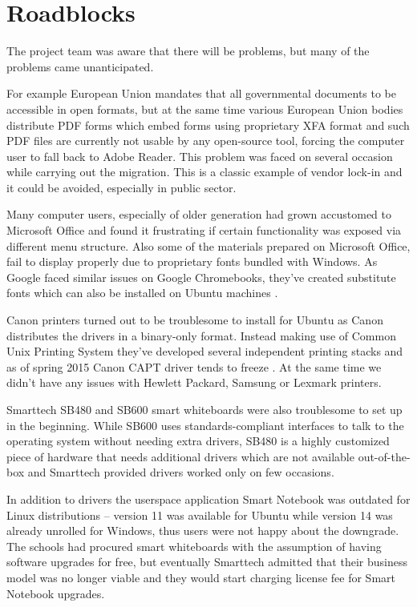 \documentclass{article}
\begin{document}
\section{Roadblocks}

The project team was aware that there will be problems,
but many of the problems came unanticipated.

For example European Union mandates that all governmental documents to
be accessible in open formats, but at the same time
various European Union bodies distribute PDF forms which
embed forms using proprietary XFA format \cite{xfa}
and such PDF files are currently not
usable by any open-source tool, forcing the computer
user to fall back to Adobe Reader.
This problem was faced on several occasion while
carrying out the migration.
This is a classic example of vendor lock-in and
it could be avoided, especially in public sector.

Many computer users, especially of older generation
had grown accustomed to
Microsoft Office and found it frustrating
if certain functionality was exposed
via different menu structure.
Also some of the materials prepared on Microsoft Office,
fail to display properly due to proprietary fonts
bundled with Windows.
As Google faced similar issues on Google Chromebooks,
they've created substitute fonts which can also be installed
on Ubuntu machines \cite{substituting-fonts}.

Canon printers turned out to be troublesome to install
for Ubuntu as Canon distributes the drivers in a binary-only
format.
Instead making use of
Common Unix Printing System \cite{cups} they've
developed several independent printing stacks and
as of spring 2015
Canon CAPT driver tends to freeze \cite{capt}.
At the same time we didn't have any issues
with Hewlett Packard, Samsung or Lexmark printers.

Smarttech SB480 and SB600 smart whiteboards were also
troublesome to set up in the beginning.
While SB600 uses standards-compliant interfaces
to talk to the operating system without needing extra drivers,
SB480 is a highly customized piece of hardware that
needs additional drivers which are not available
out-of-the-box and Smarttech provided drivers
worked only on few occasions.

In addition to drivers the userspace application
Smart Notebook was outdated for Linux distributions --
version 11 was available for Ubuntu
while version 14 was already unrolled for Windows,
thus users were not happy about the downgrade.
The schools had procured smart whiteboards with
the assumption of having software upgrades for free,
but eventually Smarttech admitted that their business
model was no longer viable and they would start charging
license fee for Smart Notebook upgrades.
\end{document}
